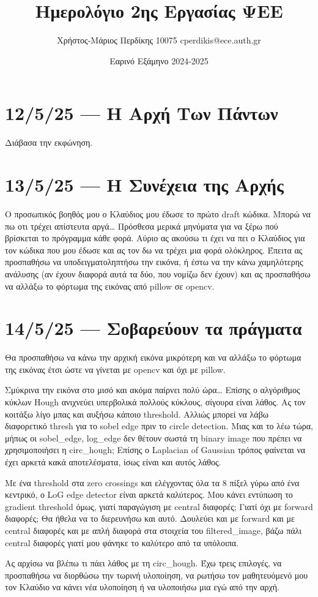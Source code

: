 \documentclass{article}
\title{Ημερολόγιο 2ης Εργασίας ΨΕΕ}
\date{Εαρινό Εξάμηνο 2024-2025}
\author{Χρήστος-Μάριος Περδίκης 10075 cperdikis@ece.auth.gr}
\begin{document}
\maketitle

\section{12/5/25 --- Η Αρχή Των Πάντων}
Διάβασα την εκφώνηση.

\section{13/5/25 --- Η Συνέχεια της Αρχής}
Ο προσωπικός βοηθός μου ο Κλαύδιος μου έδωσε το πρώτο draft κώδικα.
Μπορώ να πω οτι τρέχει απίστευτα αργά\ldots{} Πρόσθεσα μερικά μηνύματα για
να ξέρω πού βρίσκεται το πρόγραμμα κάθε φορά. Αύριο ας ακούσω τι έχει να πει ο
Κλαύδιος για τον κώδικα που μου έδωσε και ας τον δω να τρέχει μια φορά 
ολόκληρος. Έπειτα ας προσπαθήσω να υποδειγματοληπτήσω την εικόνα, ή έστω
να την κάνω χαμηλότερης ανάλυσης (αν έχουν διαφορά αυτά τα δύο, που
νομίζω δεν έχουν) και ας προσπαθήσω να αλλάξω το φόρτωμα της εικόνας
από pillow σε opencv.

\section{14/5/25 --- Σοβαρεύουν τα πράγματα}
Θα προσπαθήσω να κάνω την αρχική εικόνα μικρότερη και να αλλάξω το 
φόρτωμα της εικόνας έτσι ώστε να γίνεται με opencv και όχι με pillow.


Σμύκρινα την εικόνα στο μισό και ακόμα παίρνει πολύ ώρα\ldots{} Επίσης ο 
αλγόριθμος κύκλων Hough ανιχνεύει υπερβολικά πολλούς κύκλους, σίγουρα
είναι λάθος. Ας τον κοιτάξω λίγο μπας και αυξήσω κάποιο threshold.
Αλλιώς μπορεί να λάβω διαφορετικό thresh για το sobel edge πριν το 
circle detection. Μιας και το λέω τώρα, μήπως οι sobel\_edge, log\_edge
δεν θέτουν σωστά τη binary image που πρέπει να χρησιμοποιήσει η
circ\_hough;
Επίσης ο Laplacian of Gaussian τρόπος φαίνεται να έχει αρκετά κακά 
αποτελέσματα, ίσως είναι και αυτός λάθος.

Με ένα threshold στα zero crossings και ελέγχοντας όλα τα 8 πίξελ γύρω
από ένα κεντρικό, ο LoG edge detector είναι αρκετά καλύτερος. Μου
κάνει εντύπωση το gradient threshold όμως, γιατί παραγώγιση με central 
διαφορές; Γιατί όχι με forward διαφορές; Θα ήθελα να το διερευνήσω και αυτό.
Δουλεύει και με forward και με central διαφορές και με απλή διαφορά στα στοιχεία
του filtered\_image, βάζω πάλι central διαφορές γιατί μου φάνηκε το καλύτερο 
από τα υπόλοιπα.

Ας αρχίσω να βλέπω 
τι πάει λάθος με τη circ\_hough. Έχω τρεις επιλογές, να προσπαθήσω να διορθώσω
την τωρινή υλοποίηση, να ρωτήσω τον μαθητευόμενό μου τον Κλαύδιο να κάνει
νέα υλοποίηση ή να υλοποιήσω μια εγώ από την αρχή.
\end{document}
